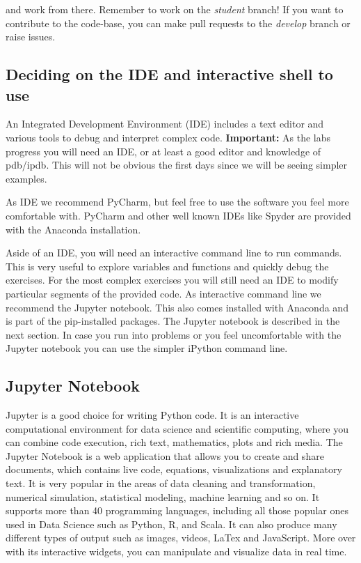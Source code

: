 \noindent and work from there. Remember to work on the \textit{student} branch! If you want to contribute to the code-base, you can make pull requests to the \textit{develop} branch or raise issues.

\subsection{Deciding on the IDE and interactive shell to use}

An Integrated Development Environment (IDE) includes a text editor and various tools to debug and interpret complex code. \textbf{Important:} As the labs progress you will need an IDE, or at least a good editor and knowledge of pdb/ipdb. This will not be obvious the first days since we will be seeing simpler examples.

As IDE we recommend PyCharm, but feel free to use the software you feel more comfortable with. PyCharm and other well known IDEs like Spyder are provided with the Anaconda installation.

Aside of an IDE, you will need an interactive command line to run commands. This is very useful to explore variables and functions and quickly debug the exercises. For the most complex exercises you will still need an IDE to modify particular segments of the provided code. As interactive command line we recommend the Jupyter notebook. This also comes installed with Anaconda and is part of the pip-installed packages. The Jupyter notebook is described in the next section. In case you run into problems or you feel uncomfortable with the Jupyter notebook you can use the simpler iPython command line.

\subsection{Jupyter Notebook}

Jupyter is a good choice for writing Python code. It is an interactive computational environment for data science and scientific computing, where you can combine code execution, rich text, mathematics, plots and rich media. The Jupyter Notebook is a web application that allows you to create and share documents, which contains live code, equations, visualizations and explanatory text. It is very popular in the areas of data cleaning and transformation, numerical simulation, statistical modeling, machine learning and so on. It supports more than 40 programming languages, including all those popular ones used in Data Science such as Python, R, and Scala. It can also produce many different types of output such as images, videos, LaTex and JavaScript. More over with its interactive widgets, you can manipulate and visualize data in real time.

